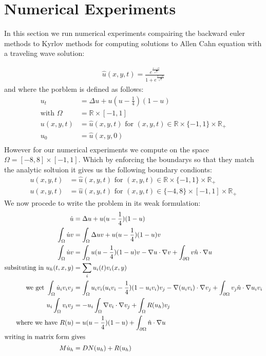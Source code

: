 \section{Numerical Experiments}

In this section we run numerical experiments compairing the backward euler methods to Kyrlov methods for computing solutions to Allen Cahn equation with a traveling wave solution\cite{YukitakaFukao2004}:

\begin{align}
    \hat u(x,y,t)=\frac{e^{\frac{x-ct}{\sqrt2}}}{1+e^{\frac{x-ct}{\sqrt2}}} \label{TravelingWaveSol}
\end{align}
and where the porblem is defined as follows:
\begin{align*}
    u_t&=\Delta u+u(u-\frac14)(1-u)\\
    \text{with } \Omega &= \mathbb{R}\times[-1,1]\\
    u(x,y,t) &= \hat u(x,y,t) \text{ for $(x,y,t) \in \mathbb{R}\times\{-1,1\}\times\mathbb{R}_+$}\\
    u_0 &= \hat u(x,y,0)\\
\end{align*}
However for our numerical experiments we compute on the space $\Omega=[-8,8]\times[-1,1]$.
Which by enforcing the boundarys so that they match the analytic soltuion it gives us the following boundary condionts:
\begin{align*}
    u(x,y,t) &= \hat u(x,y,t) \text{ for $(x,y,t) \in \mathbb{R}\times\{-1,1\}\times\mathbb{R}_+$}\\
    u(x,y,t) &= \hat u(x,y,t) \text{ for $(x,y,t) \in \{-4,8\}\times[-1,1]\times\mathbb{R}_+$}
\end{align*}
We now procede to write the problem in its weak formulation:
\begin{align*}
    \dot u&=\Delta u+u(u-\frac14)(1-u)\\
    \int_{\Omega} \dot u v &=\int_{\Omega} \Delta uv+u(u-\frac14)(1-u)v\\
    \int_{\Omega} \dot u v &=\int_{\Omega} u(u-\frac14)(1-u)v - \nabla u \cdot \nabla v + \int_{\partial\Omega}  v\hat n \cdot \nabla u\\
    \text{subsituting in } u_h(t,x,y) &= \sum_i u_i(t) v_i(x,y)\\
    \text{we get } \int_{\Omega} \dot u_i v_i v_j &=\int_{\Omega} u_iv_i(u_iv_i-\frac14)(1-u_iv_i)v_j - \nabla (u_iv_i) \cdot \nabla v_j + \int_{\partial\Omega}  v_j\hat n \cdot \nabla u_iv_i\\
    u_i\int_{\Omega}v_iv_j &= -u_i\int_{\Omega}\nabla v_i \cdot \nabla v_j + \int_{\Omega}R(u_h)v_j\\
    \text{where we have } R(u)&=u(u-\frac14)(1-u) + \int_{\partial\Omega}  \hat n \cdot \nabla u\\
    \intertext{writing in matrix form gives}
    M\dot u_h &= DN(u_h) + R(u_h)\\
\end{align*}

